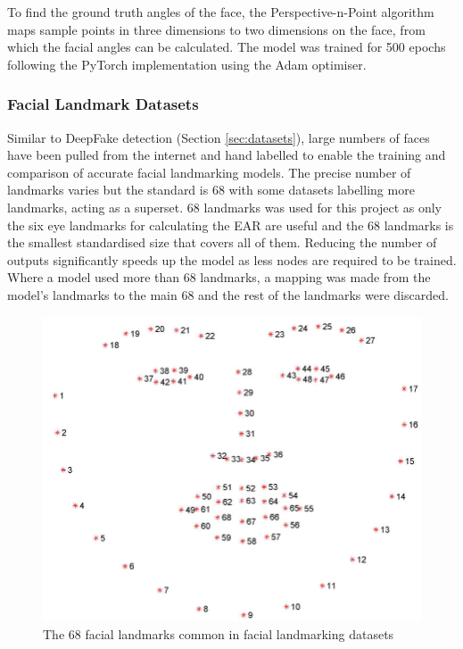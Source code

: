 To find the ground truth angles of the face, the Perspective-n-Point algorithm\cite{mallick2016head}\cite{hou2018face} maps sample points in three dimensions to two dimensions on the face, from which the facial angles can be calculated. The model was trained for 500 epochs following the PyTorch implementation\cite{zhang2016joint} using the Adam\cite{kingma2014adam} optimiser.

\subsubsection{Facial Landmark Datasets}
\label{sec:face-datasets}


Similar to DeepFake detection (Section \ref{sec:datasets}), large numbers of faces have been pulled from the internet and hand labelled to enable the training and comparison of accurate facial landmarking models. The precise number of landmarks varies but the standard is 68 with some datasets labelling more landmarks, acting as a superset. 68 landmarks was used for this project as only the six eye landmarks for calculating the EAR are useful and the 68 landmarks is the smallest standardised size that covers all of them. Reducing the number of outputs significantly speeds up the model as less nodes are required to be trained. Where a model used more than 68 landmarks, a mapping was made from the model's landmarks to the main 68 and the rest of the landmarks were discarded.

\begin{figure}[h]
    \centering
    \includegraphics[width=0.5\linewidth]{dissertation//figures/facial-landmarks.jpg}
    \caption{The 68 facial landmarks common in facial landmarking datasets\cite{sagonas2016300}}
    \label{fig:facial-landarks}
\end{figure}

